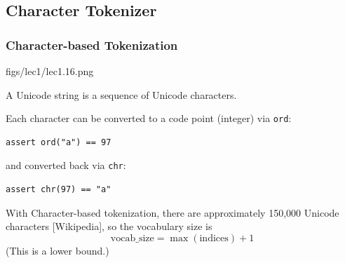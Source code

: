 
\subsection{Character Tokenizer}

\subsubsection*{Character-based Tokenization}

\MarginImageWithNote
  {figs/lec1/lec1.16.png}
  {}

A Unicode string is a sequence of Unicode characters.  

Each character can be converted to a code point (integer) via \texttt{ord}:
\begin{verbatim}
assert ord("a") == 97
\end{verbatim}
and converted back via \texttt{chr}:
\begin{verbatim}
assert chr(97) == "a"
\end{verbatim}


With Character-based tokenization, there are approximately 150{,}000 Unicode characters [Wikipedia], so the vocabulary size is
\[
  \text{vocab\_size} = \max(\text{indices}) + 1
\]
(This is a lower bound.)

